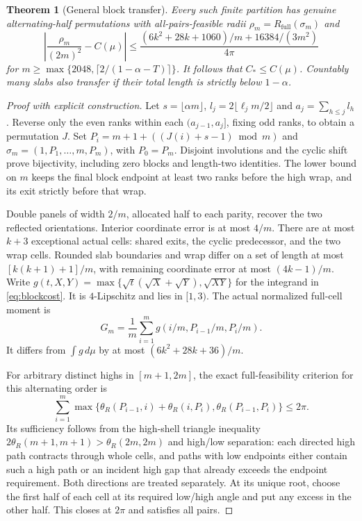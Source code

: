 \documentclass[11pt]{article}
\newtheorem{theorem}{Theorem}
\theoremstyle{definition}\newtheorem{definition}[theorem]{Definition}
\theoremstyle{remark}\newtheorem{remark}[theorem]{Remark}
\newcommand{\full}{R_{\mathrm{full}}}
\newcommand{\CC}{C_\ast}
\begin{document}
\begin{theorem}[General block transfer]\label{thm:blocks}
Every such finite partition has genuine alternating-half permutations with
all-pairs-feasible radii $\rho_m=\full(\sigma_m)$ and
\[
 \left|\frac{\rho_m}{(2m)^2}-C(\mu)\right|
 \le\frac{(6k^2+28k+1060)/m+16384/(3m^2)}{4\pi}
\]
for $m\ge\max\{2048,\lceil2/(1-\alpha-T)\rceil\}$.
It follows that $\CC\le C(\mu)$. Countably many slabs also transfer
if their total length is strictly below $1-\alpha$.
\end{theorem}
\begin{proof}[Proof with explicit construction]
Let $s=\lfloor\alpha m\rfloor$, $l_j=2\lfloor\ell_jm/2\rfloor$ and
$a_j=\sum_{h\le j}l_h$. Reverse only the even ranks within each
$(a_{j-1},a_j]$, fixing odd ranks, to obtain a permutation $J$.
Set $P_i=m+1+((J(i)+s-1)\bmod m)$ and
$\sigma_m=(1,P_1,\ldots,m,P_m)$, with $P_0=P_m$.
Disjoint involutions and the cyclic shift prove bijectivity, including
zero blocks and length-two identities. The lower bound on $m$ keeps the final
block endpoint at least two ranks before the high wrap, and its exit
strictly before that wrap.

Double panels of width $2/m$, allocated half to each parity, recover
the two reflected orientations. Interior coordinate error is at most
$4/m$. There are at most $k+3$ exceptional actual cells: shared exits,
the cyclic predecessor, and the two wrap cells. Rounded slab boundaries
and wrap differ on a set of length at most $[k(k+1)+1]/m$, with remaining
coordinate error at most $(4k-1)/m$. Write
$g(t,X,Y)=\max\{\sqrt t(\sqrt X+\sqrt Y),\sqrt{XY}\}$ for the integrand
in \eqref{eq:blockcost}. It is $4$-Lipschitz and lies in $[1,3)$.
The actual normalized full-cell moment is
\[
 G_m=\frac1m\sum_{i=1}^m g(i/m,P_{i-1}/m,P_i/m).
\]
It differs from
$\int g\,d\mu$ by at most $(6k^2+28k+36)/m$.

For arbitrary distinct highs in $[m+1,2m]$, the exact full-feasibility
criterion for this alternating order is
\[
 \sum_{i=1}^m\max\{\theta_R(P_{i-1},i)+\theta_R(i,P_i),
                         \theta_R(P_{i-1},P_i)\}\le2\pi.
\]
Its sufficiency follows from the high-shell triangle inequality
$2\theta_R(m+1,m+1)>\theta_R(2m,2m)$ and high/low separation:
each directed high path contracts through whole cells, and paths with
low endpoints either contain such a high path or an incident high gap
that already exceeds the endpoint requirement. Both directions are
treated separately. At its unique root, choose the first half of each
cell at its required low/high angle and put any excess in the other half.
This closes at $2\pi$ and satisfies all pairs.


\end{proof}
\end{document}
